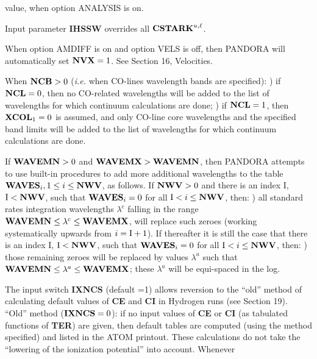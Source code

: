 value, when option ANALYSIS is on.
\blankline
\blankline
\centerline{}
\space \noindent
Input parameter {\bf IHSSW} overrides all ${\bf CSTARK}^{u,\ell}$.
\blankline
\blankline
\centerline{}
\space \noindent
When option AMDIFF is on and option VELS is off, then PANDORA will
automatically set ${\bf NVX} = 1$. See Section 16, Velocities.
\ej
\centerline{}
\space \noindent
When ${\bf NCB} > 0$ ({\it i.e.} when CO-lines wavelength bands are 
specified): ) if ${\bf NCL} = 0$, then no CO-related wavelengths will be added to 
the list of wavelengths for which continuum calculations are done; ) if ${\bf NCL} = 1$, then ${\bf XCOL}_1 = 0$ is assumed, and only
CO-line core wavelengths and the specified band limits will be added to
the list of wavelengths for which continuum calculations are done.
\blankline
\blankline
\centerline{}
\space \noindent
If ${\bf WAVEMN} > 0$ and ${\bf WAVEMX} > {\bf WAVEMN}$, then PANDORA attempts
to use built-in procedures to add more additional wavelengths to the table
${\bf WAVES}_i, 1 \leq i \leq {\bf NWV}$, as follows. \np 
If {${\bf NWV} > 0$} and there is an index I, {${\rm I} < {\bf NWV}$}, such that
{${\bf WAVES}_i = 0$} \break for all ${\rm I} < i \leq {\bf NWV}$, then: ) all standard rates integration wavelengths $\lambda^c$ falling in the range
\break ${\bf WAVEMN} \leq \lambda^c \leq {\bf WAVEMX}$, will replace such zeroes
(working systematically upwards from $i = {\rm I}+1$). \np
If thereafter it is still the case that there is an
index I, ${\rm I} < {\bf NWV}$, such that \break
${\bf WAVES}_i = 0$ for all ${\rm I} < i \leq {\bf NWV}$, then: ) those remaining zeroes will be replaced by values $\lambda^a$ such that \break
${\bf WAVEMN} \leq \lambda^a \leq {\bf WAVEMX}$; these $\lambda^a$ will be
equi-spaced in the log. \np
\blankline
\blankline
\centerline{}
\space \noindent
The input switch {\bf IXNCS} (default =1) allows reversion to the ``old'' method of
calculating default values of {\bf CE} and {\bf CI} in Hydrogen runs
(see Section 19). \np
``Old'' method (${\bf IXNCS} = 0$): if no input values of {\bf CE} or {\bf CI}
(as tabulated functions of {\bf TER}) are given, then default tables are computed
(using the method specified) and listed in the ATOM printout. These calculations
do not take the ``lowering of the ionization potential'' into account. Whenever
